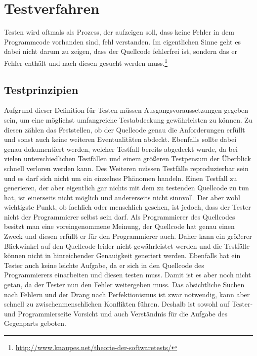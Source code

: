 \section{Testverfahren}
\authorsection{\authorEJ}

Testen wird oftmals als Prozess, der aufzeigen soll, dass keine Fehler in dem Programmcode vorhanden sind, fehl verstanden.
Im eigentlichen Sinne geht es dabei nicht darum zu zeigen, dass der Quellcode fehlerfrei ist, sondern das er Fehler enthält und nach diesen gesucht werden muss.\footnote{\url{http://www.knaupes.net/theorie-der-softwaretests/}}

\subsection{Testprinzipien}
Aufgrund dieser Definition für Testen müssen Ausgangsvoraussetzungen gegeben sein, um eine möglichst umfangreiche Testabdeckung gewährleisten zu können.
Zu diesen zählen das Feststellen, ob der Quellcode genau die Anforderungen erfüllt und sonst auch keine weiteren Eventualitäten abdeckt.
Ebenfalls sollte dabei genau dokumentiert werden, welcher Testfall bereits abgedeckt wurde, da bei vielen unterschiedlichen Testfällen und einem größeren Testpensum der Überblick schnell verloren werden kann.
Des Weiteren müssen Testfälle reproduzierbar sein und es darf sich nicht um ein einzelnes Phänomen handeln.
Einen Testfall zu generieren, der aber eigentlich gar nichts mit dem zu testenden Quellcode zu tun hat, ist einerseits nicht möglich und andererseits nicht sinnvoll.
Der aber wohl wichtigste Punkt, ob fachlich oder menschlich gesehen, ist jedoch, dass der Tester nicht der Programmierer selbst sein darf.
Als Programmierer des Quellcodes besitzt man eine voreingenommene Meinung, der Quellcode hat genau einen Zweck und diesen erfüllt er für den Programmierer auch.
Daher kann ein größerer Blickwinkel auf den Quellcode leider nicht gewährleistet werden und die Testfälle können nicht in hinreichender Genauigkeit generiert werden.
Ebenfalls hat ein Tester auch keine leichte Aufgabe, da er sich in den Quellcode des Programmierers einarbeiten und diesen testen muss.
Damit ist es aber noch nicht getan, da der Tester nun den Fehler weitergeben muss.
Das absichtliche Suchen nach Fehlern und der Drang nach Perfektionismus ist zwar notwendig, kann aber schnell zu zwischenmenschlichen Konflikten führen.
Deshalb ist sowohl auf Tester- und Programmierseite Vorsicht und auch Verständnis für die Aufgabe des Gegenparts geboten.

